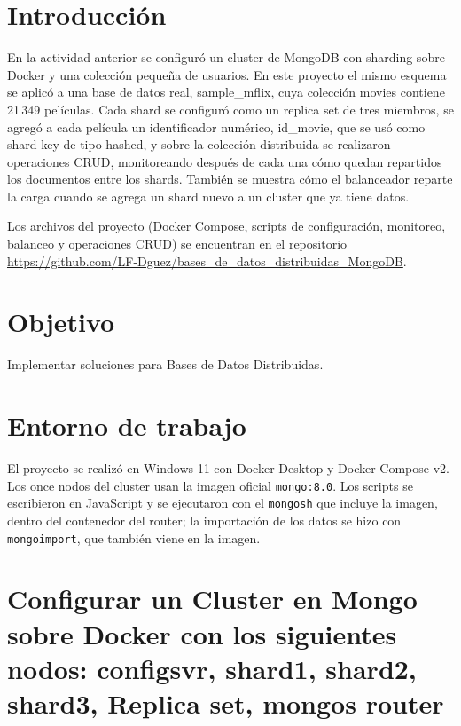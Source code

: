 \documentclass[12pt]{article}
\begin{document}
\section{Introducción}

En la actividad anterior se configuró un cluster de MongoDB con sharding sobre Docker y una colección pequeña de usuarios. En este proyecto el mismo esquema se aplicó a una base de datos real, sample\_mflix, cuya colección movies contiene 21\,349 películas. Cada shard se configuró como un replica set de tres miembros, se agregó a cada película un identificador numérico, id\_movie, que se usó como shard key de tipo hashed, y sobre la colección distribuida se realizaron operaciones CRUD, monitoreando después de cada una cómo quedan repartidos los documentos entre los shards. También se muestra cómo el balanceador reparte la carga cuando se agrega un shard nuevo a un cluster que ya tiene datos.

Los archivos del proyecto (Docker Compose, scripts de configuración, monitoreo, balanceo y operaciones CRUD) se encuentran en el repositorio \url{https://github.com/LF-Dguez/bases_de_datos_distribuidas_MongoDB}.

\section{Objetivo}

Implementar soluciones para Bases de Datos Distribuidas.

\section{Entorno de trabajo}

El proyecto se realizó en Windows 11 con Docker Desktop y Docker Compose v2. Los once nodos del cluster usan la imagen oficial \texttt{mongo:8.0}. Los scripts se escribieron en JavaScript y se ejecutaron con el \texttt{mongosh} que incluye la imagen, dentro del contenedor del router; la importación de los datos se hizo con \texttt{mongoimport}, que también viene en la imagen.

\section{Configurar un Cluster en Mongo sobre Docker con los siguientes nodos: configsvr, shard1, shard2, shard3, Replica set, mongos router}
\end{document}
